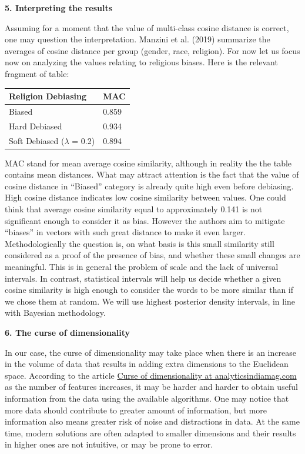 \documentclass[10pt,dvipsnames,enabledeprecatedfontcommands]{scrartcl}
\begin{document}
\textbf{5. Interpreting the results}

Assuming for a moment that the value of multi-class cosine distance is
correct, one may question the interpretation. Manzini et al. (2019)
summarize the averages of cosine distance per group (gender, race,
religion). For now let us focus now on analyzing the values relating to
religious biases. Here is the relevant fragment of table:

\begin{longtable}[]{@{}ll@{}}
\toprule
Religion Debiasing & MAC\tabularnewline
\midrule
\endhead
Biased & 0.859\tabularnewline
Hard Debiased & 0.934\tabularnewline
Soft Debiased (\(\lambda\) = 0.2) & 0.894\tabularnewline
\bottomrule
\end{longtable}

MAC stand for mean average cosine similarity, although in reality the
the table contains mean distances. What may attract attention is the
fact that the value of cosine distance in ``Biased'' category is already
quite high even before debiasing. High cosine distance indicates low
cosine similarity between values. One could think that average cosine
similarity equal to approximately 0.141 is not significant enough to
consider it as bias. However the authors aim to mitigate ``biases'' in
vectors with such great distance to make it even larger.
Methodologically the question is, on what basis is this small similarity
still considered as a proof of the presence of bias, and whether these
small changes are meaningful. This is in general the problem of scale
and the lack of universal intervals. In contrast, statistical intervals
will help us decide whether a given cosine similarity is high enough to
consider the words to be more similar than if we chose them at random.
We will use highest posterior density intervals, in line with Bayesian
methodology.

\textbf{6. The curse of dimensionality}

In our case, the curse of dimensionality may take place when there is an
increase in the volume of data that results in adding extra dimensions
to the Euclidean space. According to the article
\href{https://analyticsindiamag.com/curse-of-dimensionality-and-what-beginners-should-do-to-overcome-it/}{Curse
of dimensionality at analyticsindiamag.com} as the number of features
increases, it may be harder and harder to obtain useful information from
the data using the available algorithms. One may notice that more data
should contribute to greater amount of information, but more information
also means greater risk of noise and distractions in data. At the same
time, modern solutions are often adapted to smaller dimensions and their
results in higher ones are not intuitive, or may be prone to error.
\end{document}
